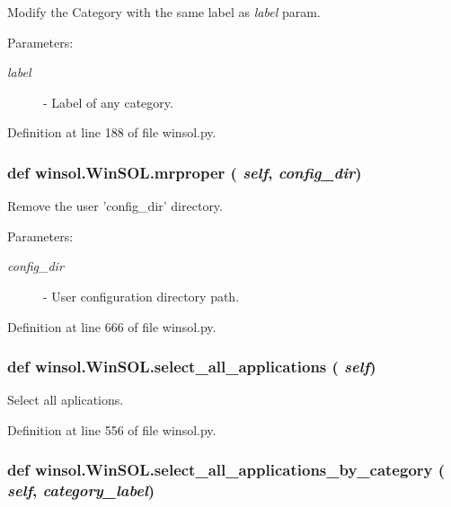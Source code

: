 Modify the Category with the same label as {\em label\/} param. 

\begin{Desc}
\item[Parameters:]
\begin{description}
\item[{\em label}]- Label of any category. \end{description}
\end{Desc}


Definition at line 188 of file winsol.py.\hypertarget{classwinsol_1_1WinSOL_0653c756ac4ef940d1d79cd85cd525e5}{
\subsubsection[mrproper]{\setlength{\rightskip}{0pt plus 5cm}def winsol.Win\-SOL.mrproper ( {\em self},  {\em config\_\-dir})}}
\label{classwinsol_1_1WinSOL_0653c756ac4ef940d1d79cd85cd525e5}


Remove the user 'config\_\-dir' directory. 

\begin{Desc}
\item[Parameters:]
\begin{description}
\item[{\em config\_\-dir}]- User configuration directory path. \end{description}
\end{Desc}


Definition at line 666 of file winsol.py.\hypertarget{classwinsol_1_1WinSOL_328429378b2ee80ceaebf0c36b8a979c}{
\subsubsection[select\_\-all\_\-applications]{\setlength{\rightskip}{0pt plus 5cm}def winsol.Win\-SOL.select\_\-all\_\-applications ( {\em self})}}
\label{classwinsol_1_1WinSOL_328429378b2ee80ceaebf0c36b8a979c}


Select all aplications. 



Definition at line 556 of file winsol.py.\hypertarget{classwinsol_1_1WinSOL_857737591d3b4d78cc949aa04fdee178}{
\subsubsection[select\_\-all\_\-applications\_\-by\_\-category]{\setlength{\rightskip}{0pt plus 5cm}def winsol.Win\-SOL.select\_\-all\_\-applications\_\-by\_\-category ( {\em self},  {\em category\_\-label})}}
\label{classwinsol_1_1WinSOL_857737591d3b4d78cc949aa04fdee178}


